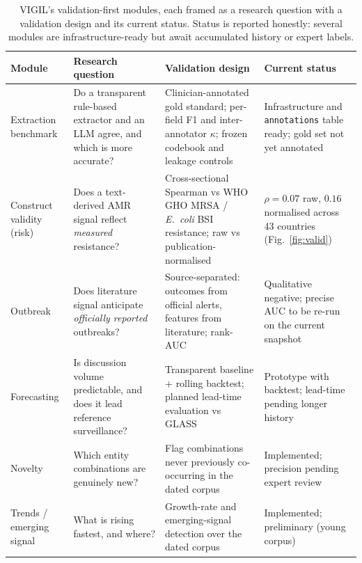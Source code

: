 \documentclass[10pt]{article}
\begin{document}
\begin{table}[h]
  \centering
  \caption{VIGIL's validation-first modules, each framed as a research question with
  a validation design and its current status. Status is reported honestly: several
  modules are infrastructure-ready but await accumulated history or expert labels.}
  \label{tab:modules}
  \footnotesize
  \renewcommand{\arraystretch}{1.25}
  \begin{tabular}{@{}p{2.0cm}p{3.5cm}p{4.0cm}p{3.5cm}@{}}
    \toprule
    \textbf{Module} & \textbf{Research question} & \textbf{Validation design} & \textbf{Current status} \\
    \midrule
    Extraction benchmark & Do a transparent rule-based extractor and an LLM agree, and which is more accurate? & Clinician-annotated gold standard; per-field F1 and inter-annotator $\kappa$; frozen codebook and leakage controls & Infrastructure and \texttt{annotations} table ready; gold set not yet annotated \\
    Construct validity (risk) & Does a text-derived AMR signal reflect \emph{measured} resistance? & Cross-sectional Spearman vs WHO GHO MRSA / \textit{E.\ coli} BSI resistance; raw vs publication-normalised & $\rho=0.07$ raw, $0.16$ normalised across 43 countries (Fig.~\ref{fig:valid}) \\
    Outbreak & Does literature signal anticipate \emph{officially reported} outbreaks? & Source-separated: outcomes from official alerts, features from literature; rank-AUC & Qualitative negative; precise AUC to be re-run on the current snapshot \\
    Forecasting & Is discussion volume predictable, and does it lead reference surveillance? & Transparent baseline + rolling backtest; planned lead-time evaluation vs GLASS & Prototype with backtest; lead-time pending longer history \\
    Novelty & Which entity combinations are genuinely new? & Flag combinations never previously co-occurring in the dated corpus & Implemented; precision pending expert review \\
    Trends / emerging signal & What is rising fastest, and where? & Growth-rate and emerging-signal detection over the dated corpus & Implemented; preliminary (young corpus) \\
    \bottomrule
  \end{tabular}
\end{table}
\end{document}
